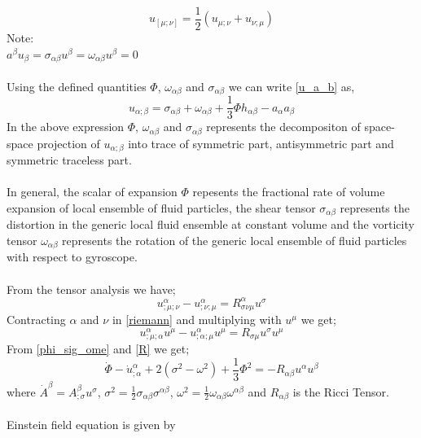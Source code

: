 $$u_{[\mu;\nu]}=\frac{1}{2}\left(u_{\mu;\nu}+u_{\nu;\mu}\right)$$
Note: \\$a^\beta u_\beta=\sigma_{\alpha\beta}u^{\beta}=\omega_{\alpha\beta}u^{\beta}=0$
\\\\
Using the defined quantities $\Phi$, $\omega_{\alpha\beta}$ and $\sigma_{\alpha\beta}$ we can write \eqref{u_a_b} as,
\begin{equation}\label{phi_sig_ome}
u_{\alpha ;\beta}=\sigma_{\alpha\beta}+\omega_{\alpha\beta}+\frac{1}{3}\Phi h_{\alpha\beta}-a_\alpha a_\beta
\end{equation}
In the above expression $\Phi$, $\omega_{\alpha\beta}$ and $\sigma_{\alpha\beta}$ represents the decompositon of space-space projection of $u_{\alpha ;\beta}$ into trace of symmetric part, antisymmetric part and symmetric traceless part.\\\\
In general, the scalar of expansion $\Phi$ repesents the fractional rate of volume expansion of local ensemble of fluid particles, the shear tensor $\sigma_{\alpha\beta}$ represents the distortion in the generic local fluid ensemble at constant volume and the vorticity tensor $\omega_{\alpha\beta}$ represents the rotation of the generic local ensemble of fluid particles with respect to gyroscope.\\\\
From the tensor analysis we have;
\begin{equation}\label{riemann}
u_{;\mu;\nu}^\alpha-u_{;\nu;\mu}^\alpha=R^\alpha_{\sigma\nu\mu}u^\sigma
\end{equation}
Contracting $\alpha$ and $\nu$ in \eqref{riemann} and multiplying with $u^\mu$ we get;
\begin{equation}\label{R}
u_{;\mu;\alpha}^\alpha u^{\mu}-u^{\alpha}_{;\alpha;\mu}u^{\mu}=R_{\sigma\mu}u^{\sigma}u^{\mu}
\end{equation}
From \eqref{phi_sig_ome} and \eqref{R} we get;
\begin{equation}\label{Raychudhari_0}
\dot{\Phi}-\dot{u}^\alpha_{;\alpha}+2(\sigma^2-\omega^2)+\frac{1}{3}\Phi^2 =-R_{\alpha\beta}u^\alpha u^\beta
\end{equation}
where $\dot{A}^\beta=A^\beta_{;\sigma}u^\sigma$, $\sigma^2=\frac{1}{2}\sigma_{\alpha\beta}\sigma^{\alpha\beta}$, $\omega^2=\frac{1}{2}\omega_{\alpha\beta}\omega^{\alpha\beta}$ and $R_{\alpha\beta}$ is the Ricci Tensor.\\\\
Einstein field equation is given by
